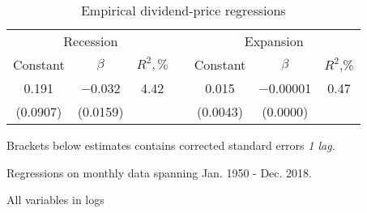 \begin{table}[H]
 \centering
   \caption{Empirical dividend-price regressions}           
   \label{tab:regressEmp}
 \begin{threeparttable}
 \begin{tabular}{@{}ccccccc@{}}
 \toprule
   \multicolumn{3}{c}{Recession} && \multicolumn{3}{c}{Expansion} \\ 
 \addlinespace
 Constant  & $\beta$  &  $R^2,\%$     && Constant & $\beta$   &  $R^2$,\%      \\
 \cmidrule(lr){1-3} \cmidrule(lr){5-7}
 0.191  & $-$0.032 & 4.42             && 0.015    & $-$0.00001  & 0.47           \\ 
 \addlinespace
 (0.0907)  & (0.0159) &               && (0.0043) & (0.0000)  &                \\
 \bottomrule
 \end{tabular}
 \begin{tablenotes}\footnotesize{
 \item[1] Brackets below estimates contains \citet{NW87} corrected standard errors \textit{1 lag}. 
 \item[2] Regressions on monthly data spanning Jan. 1950 - Dec. 2018.
 \item[3] All variables in logs
 }
 \end{tablenotes}
 \end{threeparttable}
 \end{table}